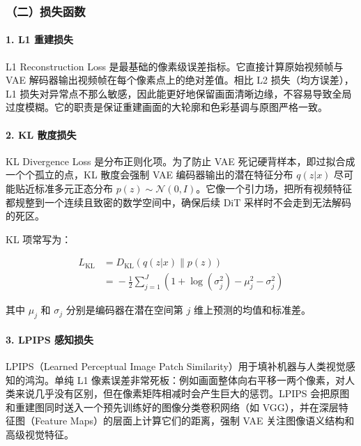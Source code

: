 \hypertarget{ux4e8cux635fux5931ux51fdux6570}{%
\subsubsection{（二）损失函数}\label{ux4e8cux635fux5931ux51fdux6570}}

\hypertarget{l1-ux91cdux5efaux635fux5931}{%
\paragraph{1. L1 重建损失}\label{l1-ux91cdux5efaux635fux5931}}

L1 Reconstruction Loss 是最基础的像素级误差指标。它直接计算原始视频帧与 VAE 解码器输出视频帧在每个像素点上的绝对差值。相比 L2 损失（均方误差），L1 损失对异常点不那么敏感，因此能更好地保留画面清晰边缘，不容易导致全局过度模糊。它的职责是保证重建画面的大轮廓和色彩基调与原图严格一致。

\hypertarget{kl-ux6563ux5ea6ux635fux5931}{%
\paragraph{2. KL 散度损失}\label{kl-ux6563ux5ea6ux635fux5931}}

KL Divergence Loss 是分布正则化项。为了防止 VAE 死记硬背样本，即过拟合成一个个孤立的点，KL 散度会强制 VAE 编码器输出的潜在特征分布 \(q(z|x)\) 尽可能贴近标准多元正态分布 \(p(z)\sim\mathcal{N}(0,I)\)。它像一个引力场，把所有视频特征都规整到一个连续且致密的数学空间中，确保后续 DiT 采样时不会走到无法解码的死区。

KL 项常写为：

\[
\begin{aligned}
L_{\mathrm{KL}}
&=
D_{\mathrm{KL}}(q(z|x)\|p(z))
\\
&=
{}-\frac{1}{2}\sum_{j=1}^{J}
\left(1+\log(\sigma_j^2)-\mu_j^2-\sigma_j^2\right)
\end{aligned}
\]

其中 \(\mu_j\) 和 \(\sigma_j\) 分别是编码器在潜在空间第 \(j\) 维上预测的均值和标准差。

\hypertarget{lpips-ux611fux77e5ux635fux5931}{%
\paragraph{3. LPIPS 感知损失}\label{lpips-ux611fux77e5ux635fux5931}}

LPIPS（Learned Perceptual Image Patch Similarity）用于填补机器与人类视觉感知的鸿沟。单纯 L1 像素误差非常死板：例如画面整体向右平移一两个像素，对人类来说几乎没有区别，但在像素矩阵相减时会产生巨大的惩罚。LPIPS 会把原图和重建图同时送入一个预先训练好的图像分类卷积网络（如 VGG），并在深层特征图（Feature Maps）的层面上计算它们的距离，强制 VAE 关注图像语义结构和高级视觉特征。

